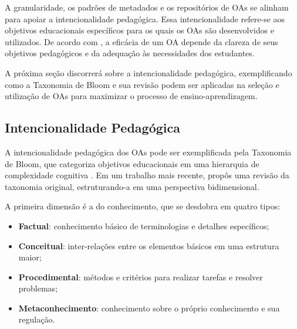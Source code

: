 
A granularidade, os padrões de metadados e os repositórios de OAs se alinham para apoiar a intencionalidade pedagógica. Essa intencionalidade refere-se aos objetivos educacionais específicos para os quais os OAs são desenvolvidos e utilizados. De acordo com , a eficácia de um OA depende da clareza de seus objetivos pedagógicos e da adequação às necessidades dos estudantes.

A próxima seção discorrerá sobre a intencionalidade pedagógica, exemplificando como a Taxonomia de Bloom e sua revisão podem ser aplicadas na seleção e utilização de OAs para maximizar o processo de ensino-aprendizagem.

\subsection{Intencionalidade Pedagógica}

A intencionalidade pedagógica dos OAs pode ser exemplificada pela Taxonomia de Bloom, que categoriza objetivos educacionais em uma hierarquia de complexidade cognitiva \cite{Bloom1984}. Em um trabalho mais recente,  propôs uma revisão da taxonomia original, estruturando-a em uma perspectiva bidimensional. 

A primeira dimensão é a do conhecimento, que se desdobra em quatro tipos:

\begin{itemize}
    \item \textbf{Factual}: conhecimento básico de terminologias e detalhes específicos;
    \item \textbf{Conceitual}: inter-relações entre os elementos básicos em uma estrutura maior;
    \item \textbf{Procedimental}: métodos e critérios para realizar tarefas e resolver problemas;
    \item \textbf{Metaconhecimento}: conhecimento sobre o próprio conhecimento e sua regulação.
\end{itemize}

